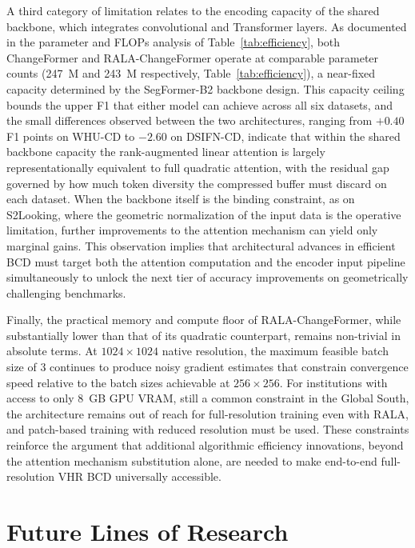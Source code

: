 A third category of limitation relates to the encoding capacity of the shared backbone, which integrates convolutional and Transformer layers. As documented in the parameter and \ac{FLOPs} analysis of Table~\ref{tab:efficiency}, both ChangeFormer and RALA-ChangeFormer operate at comparable parameter counts (247~M and 243~M respectively, Table~\ref{tab:efficiency}), a near-fixed capacity determined by the SegFormer-B2 backbone design. This capacity ceiling bounds the upper F1 that either model can achieve across all six datasets, and the small differences observed between the two architectures, ranging from $+0.40$ F1 points on WHU-CD to $-2.60$ on DSIFN-CD, indicate that within the shared backbone capacity the rank-augmented linear attention is largely representationally equivalent to full quadratic attention, with the residual gap governed by how much token diversity the compressed buffer must discard on each dataset. When the backbone itself is the binding constraint, as on S2Looking, where the geometric normalization of the input data is the operative limitation, further improvements to the attention mechanism can yield only marginal gains. This observation implies that architectural advances in efficient \ac{BCD} must target both the attention computation and the encoder input pipeline simultaneously to unlock the next tier of accuracy improvements on geometrically challenging benchmarks.

Finally, the practical memory and compute floor of RALA-ChangeFormer, while substantially lower than that of its quadratic counterpart, remains non-trivial in absolute terms. At $1024 \times 1024$ native resolution, the maximum feasible batch size of 3 continues to produce noisy gradient estimates that constrain convergence speed relative to the batch sizes achievable at $256 \times 256$. For institutions with access to only 8~GB \ac{GPU} \ac{VRAM}, still a common constraint in the Global South, the architecture remains out of reach for full-resolution training even with \ac{RALA}, and patch-based training with reduced resolution must be used. These constraints reinforce the argument that additional algorithmic efficiency innovations, beyond the attention mechanism substitution alone, are needed to make end-to-end full-resolution \ac{VHR} \ac{BCD} universally accessible.


\section{Future Lines of Research}
\label{sec:conclusions-future}


